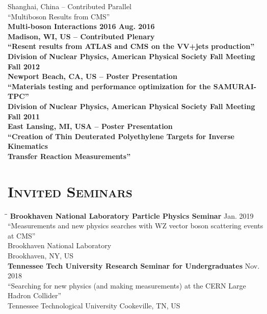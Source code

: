 \documentclass[10pt]{res} %
\begin{document}
\begin{resume}
\begin{tabbing}
Shanghai, China -- Contributed Parallel \\
``Multiboson Results from CMS'' \\
\bf{Multi-boson Interactions 2016} 		 \> \>	    Aug. 2016 \\
Madison, WI, US -- Contributed Plenary \\
``Resent results from ATLAS and CMS on the VV+jets production'' \\
\bf{Division of Nuclear Physics, American Physical Society Fall Meeting} 		 \> \>	    Fall 2012 \\
Newport Beach, CA, US -- Poster Presentation\\
``Materials testing and performance optimization for the SAMURAI-TPC'' \\
\bf{Division of Nuclear Physics, American Physical Society Fall Meeting} 		 \> \>	    Fall 2011 \\
East Lansing, MI, USA -- Poster Presentation\\ 
``Creation of Thin Deuterated Polyethylene Targets for Inverse Kinematics \\Transfer Reaction Measurements'' \\
\end{tabbing}\vspace{-20pt}      %

\section{\textsc{Invited Seminars}}
\vspace{-0.1in}
\begin{tabbing}
\hspace{2.3in}\= \hspace{2.6in}\= \kill %
\textbf{Brookhaven National Laboratory Particle Physics Seminar} \>\> Jan. 2019\\ 
``Measurements and new physics searches with WZ vector boson scattering events at CMS'' \\
Brookhaven National Laboratory \\
Brookhaven, NY, US \\
\textbf{Tennessee Tech University Research Seminar for Undergraduates} \>\> Nov. 2018\\ 
``Searching for new physics (and making measurements) at the CERN Large Hadron Collider'' \\
Tennessee Technological University
Cookeville, TN, US \\
\end{tabbing}\vspace{-20pt}      %


\end{resume}
\end{document}
